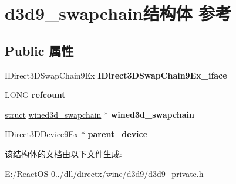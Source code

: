 \hypertarget{structd3d9__swapchain}{}\section{d3d9\+\_\+swapchain结构体 参考}
\label{structd3d9__swapchain}
\subsection*{Public 属性}
\begin{DoxyCompactItemize}
\item 
\mbox{\label{structd3d9__swapchain_a0a969cf538582354652e1c4da8285855}} 
I\+Direct3\+D\+Swap\+Chain9\+Ex {\bfseries I\+Direct3\+D\+Swap\+Chain9\+Ex\+\_\+iface}
\item 
\mbox{\label{structd3d9__swapchain_a65e803a7d3a006aa204a1e0e78ddfd41}} 
L\+O\+NG {\bfseries refcount}
\item 
\mbox{\label{structd3d9__swapchain_a5cde0512aef07300dd88df2f248d317b}} 
\hyperlink{interfacestruct}{struct} \hyperlink{structwined3d__swapchain}{wined3d\+\_\+swapchain} $\ast$ {\bfseries wined3d\+\_\+swapchain}
\item 
\mbox{\label{structd3d9__swapchain_a4bc3bdc34a7b33279f6bd9b3ce05aa6b}} 
I\+Direct3\+D\+Device9\+Ex $\ast$ {\bfseries parent\+\_\+device}
\end{DoxyCompactItemize}


该结构体的文档由以下文件生成\+:\begin{DoxyCompactItemize}
\item 
E\+:/\+React\+O\+S-\/0../dll/directx/wine/d3d9/d3d9\+\_\+private.\+h\end{DoxyCompactItemize}
